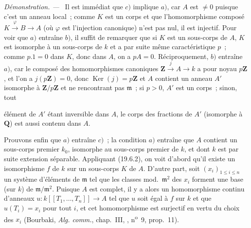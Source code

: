 \documentclass[10pt,oneside]{book}
\newcommand{\oldpage}[2][]{%
  \setcounter{footnote}{0}%
  \marginpar{\scriptsize\textbf{#1}~|~#2}\ignorespaces}
\newenvironment{proof}{%
  \par\medskip\noindent\textit{Démonstration. ---\ }}{\par}
\begin{document}
\begin{proof}
Il est immédiat que $c)$ implique $a)$, car $A$ est $\neq0$ puisque c'est un
anneau local~; comme $K$ est un corps et que l'homomorphisme composé
$K\xrightarrow{\varphi}B\to A$ (où $\varphi$ est l'injection canonique) n'est
pas nul, il est injectif. Pour voir que $a)$ entraîne $b)$, il suffit de
remarquer que si $K$ est un sous-corps de $A$, $K$ est isomorphe à un
sous-corps de $k$ et a par suite même caractéristique $p$~; comme $p.1=0$ dans
$K$, donc dans $A$, on a $pA=0$. Réciproquement, $b)$ entraîne $a)$, car le
composé des homomorphismes canoniques
$\mathbf Z\xrightarrow{j}A\to k$ a pour noyau $p\mathbf Z$, et l'on a
$j(p\mathbf Z)=0$, donc $\operatorname{Ker}(j)=p\mathbf Z$ et $A$ contient un
anneau $A'$ isomorphe à $\mathbf Z/p\mathbf Z$ et ne rencontrant pas
$\mathfrak m$~; si $p>0$, $A'$ est un corps~; sinon, tout

\oldpage[0\textsubscript{IV-1}]{102}

élément de $A'$ étant inversible dans $A$, le corps des fractions de $A'$
(isomorphe à $\mathbf Q$) est aussi contenu dans $A$.

Prouvons enfin que $a)$ entraîne $c)$~; la condition $a)$ entraîne que $A$
contient un sous-corps premier $k_0$, isomorphe au sous-corps premier de $k$,
et dont $k$ est par suite extension séparable. Appliquant (19.6.2), on voit
d'abord qu'il existe un isomorphisme $f$ de $k$ sur un sous-corps $K$ de $A$.
D'autre part, soit $(x_i)_{1\leq i\leq n}$ un système d'éléments de
$\mathfrak m$ tel que les classes mod.~$\mathfrak m^2$ des $x_i$ forment une
base (sur $k$) de $\mathfrak m/\mathfrak m^2$. Puisque $A$ est complet, il y a
alors un homomorphisme continu d'anneaux
$u:k[[T_1,\ldots,T_n]]\to A$ tel que $u$ soit égal à $f$ sur $k$ et que
$u(T_i)=x_i$ pour tout $i$, et cet homomorphisme est surjectif en vertu du
choix des $x_i$ (Bourbaki, \emph{Alg. comm.}, chap.~III, ,
n\textsuperscript{o}~9, prop.~11).
\end{proof}
\end{document}
